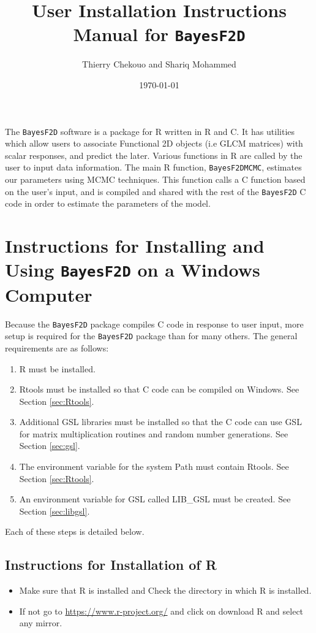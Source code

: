 \documentclass{article}
\title{User Installation Instructions Manual for \texttt{BayesF2D}}
\author{Thierry Chekouo and Shariq Mohammed}
\date{\today}
\begin{document}


\maketitle
The \texttt{BayesF2D} software is a package for R written in R and C.  It has utilities which allow users to associate Functional 2D objects (i.e GLCM matrices) with scalar responses, and predict the later.  Various functions in R are called by the user to input  data information. The main R function, \texttt{BayesF2DMCMC}, estimates our parameters using MCMC techniques. This function calls a C function based on the user's input, and is compiled and shared with the rest of the \texttt{BayesF2D} C code in order to estimate the parameters of the model.



\section{\Large Instructions for Installing and Using \texttt{BayesF2D} on a Windows Computer}
Because the \texttt{BayesF2D} package compiles C code in response to user input, more setup is required for the \texttt{BayesF2D} package than for many others. The general requirements are as follows:

\begin{enumerate}
\item R must be installed. 
\item Rtools must be installed so that C code can be compiled on Windows. See Section \ref{sec:Rtools}.
\item Additional GSL libraries must be installed so that the C code can use GSL for matrix multiplication routines and random number generations. See Section \ref{sec:gsl}.
\item The environment variable for the system Path must contain Rtools. See Section \ref{sec:Rtools}.
\item An environment variable for GSL called LIB\_GSL must be created. See Section \ref{sec:libgsl}.
\end{enumerate}

Each of these steps is detailed below.  %

\subsection{\Large Instructions for Installation of R}
\label{sec:R}
\begin{itemize}
    \item Make sure that R is installed and Check the directory in which R is installed.
    \item If not go to \href{https://www.r-project.org/}{https://www.r-project.org/}  and click on download R and select any mirror.
\end{itemize}
\end{document}
